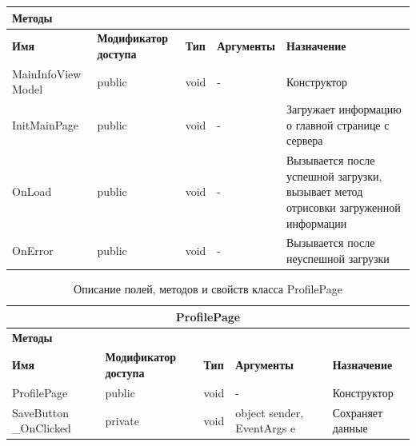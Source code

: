 \documentclass{../includes/TechDoc}
\begin{document}
\begin{table}[ht]
\begin{tabular}{|p{3.2cm}|p{3cm}|p{2.9cm}|p{2.9cm}|p{4cm}|}
            \multicolumn{5}{|l|}{\textbf{Методы}} \\ \hline
            \textbf{Имя} & \textbf{Модификатор доступа} & \textbf{Тип} & \textbf{Аргументы} & \textbf{Назначение} \\ \hline
            MainInfoView Model & public & void & - & Конструктор \\ \hline
            InitMainPage & public & void & - & Загружает информацию о главной странице с сервера \\ \hline
            OnLoad & public & void & - & Вызывается после успешной загрузки, вызывает метод отрисовки загруженной информации \\ \hline
            OnError & public & void & - & Вызывается после неуспешной загрузки \\ \hline
        \end{tabular}
    \end{table}

    \begin{table}[ht]
        \caption{\label{tab:class-profilepage-table}Описание полей, методов и свойств класса ProfilePage}
        \centering
        \begin{tabular}{|p{3.2cm}|p{3cm}|p{2.9cm}|p{2.9cm}|p{4cm}|}
            \hline
            \multicolumn{5}{|c|}{ProfilePage} \\ \hline
            \multicolumn{5}{|l|}{\textbf{Методы}} \\ \hline
            \textbf{Имя} & \textbf{Модификатор доступа} & \textbf{Тип} & \textbf{Аргументы} & \textbf{Назначение} \\ \hline
            ProfilePage & public & void & - & Конструктор \\ \hline
            SaveButton \_OnClicked & private & void & object sender, EventArgs e & Сохраняет данные \\ \hline
        \end{tabular}
    \end{table}
\end{document}
